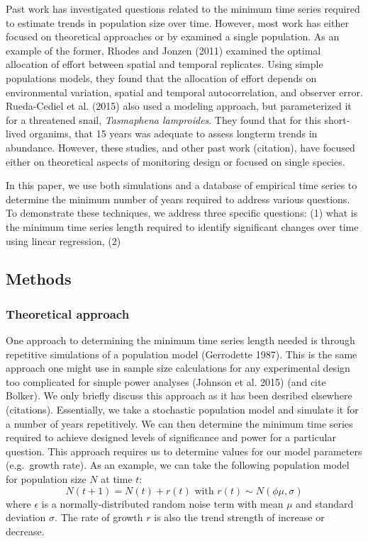 \documentclass[12pt,]{article}
\begin{document}
Past work has investigated questions related to the minimum time series
required to estimate trends in population size over time. However, most
work has either focused on theoretical approaches or by examined a
single population. As an example of the former, Rhodes and Jonzen (2011)
examined the optimal allocation of effort between spatial and temporal
replicates. Using simple populations models, they found that the
allocation of effort depends on environmental variation, spatial and
temporal autocorrelation, and observer error. Rueda-Cediel et al. (2015)
also used a modeling approach, but parameterized it for a threatened
snail, \emph{Tasmaphena lamproides}. They found that for this
short-lived organims, that 15 years was adequate to assess longterm
trends in abundance. However, these studies, and other past work
(citation), have focused either on theoretical aspects of monitoring
design or focused on single species.

In this paper, we use both simulations and a database of empirical time
series to determine the minimum number of years required to address
various questions. To demonstrate these techniques, we address three
specific questions: (1) what is the minimum time series length required
to identify significant changes over time using linear regression, (2)

\subsection{Methods}\label{methods}

\subsubsection{Theoretical approach}\label{theoretical-approach}

One approach to determining the minimum time series length needed is
through repetitive simulations of a population model (Gerrodette 1987).
This is the same approach one might use in sample size calculations for
any experimental design too complicated for simple power analyses
(Johnson et al. 2015) (and cite Bolker). We only briefly discuss this
approach as it has been desribed elsewhere (citations). Essentially, we
take a stochastic population model and simulate it for a number of years
repetitively. We can then determine the minimum time series required to
achieve designed levels of significance and power for a particular
question. This approach requires us to determine values for our model
parameters (e.g.~growth rate). As an example, we can take the following
population model for population size \(N\) at time \(t\): \[
N(t + 1) = N(t) + r(t) \mbox{ with } r(t) \sim N(\phi \mu, \sigma)
\] where \(\epsilon\) is a normally-distributed random noise term with
mean \(\mu\) and standard deviation \(\sigma\). The rate of growth \(r\)
is also the trend strength of increase or decrease.
\end{document}
